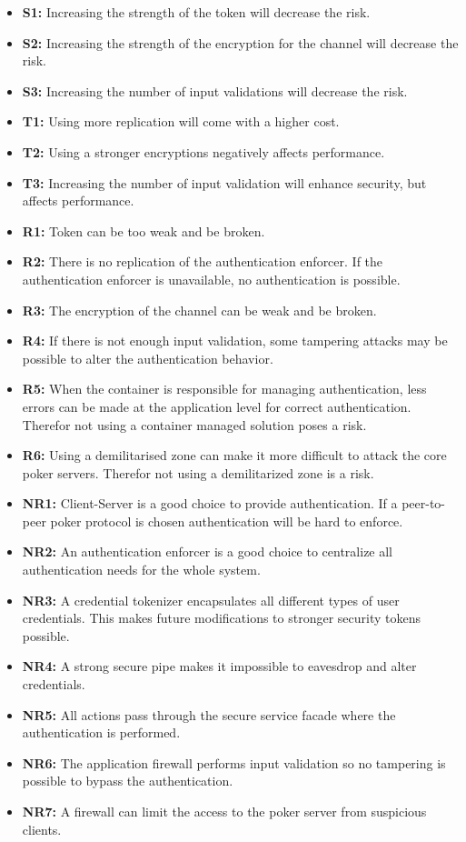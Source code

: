 \documentclass[a4paper,11pt]{report}
\begin{document}
\begin{itemize}
\item \textbf{S1:} Increasing the strength of the token will decrease the risk.
\item \textbf{S2:} Increasing the strength of the encryption for the channel will decrease the risk.
\item \textbf{S3:} Increasing the number of input validations will decrease the risk.
\item \textbf{T1:} Using more replication will come with a higher cost.
\item \textbf{T2:} Using a stronger encryptions negatively affects performance.
\item \textbf{T3:} Increasing the number of input validation will enhance security, but affects performance.
\item \textbf{R1:} Token can be too weak and be broken.
\item \textbf{R2:} There is no replication of the authentication enforcer. If the authentication enforcer is unavailable, no authentication is possible.
\item \textbf{R3:} The encryption of the channel can be weak and be broken.
\item \textbf{R4:} If there is not enough input validation, some tampering attacks may be possible to alter the authentication behavior.
\item \textbf{R5:} When the container is responsible for managing authentication, less errors can be made at the application level for correct authentication. Therefor not using a container managed solution poses a risk.
\item \textbf{R6:} Using a demilitarised zone can make it more difficult to attack the core poker servers. Therefor not using a demilitarized zone is a risk.
\item \textbf{NR1:} Client-Server is a good choice to provide authentication. If a peer-to-peer poker protocol is chosen authentication will be hard to enforce.
\item \textbf{NR2:} An authentication enforcer is a good choice to centralize all authentication needs for the whole system.
\item \textbf{NR3:} A credential tokenizer encapsulates all different types of user credentials. This makes future modifications to stronger security tokens possible.
\item \textbf{NR4:} A strong secure pipe makes it impossible to eavesdrop and alter credentials. 
\item \textbf{NR5:} All actions pass through the secure service facade where the authentication is performed.
\item \textbf{NR6:} The application firewall performs input validation so no tampering is possible to bypass the authentication.
\item \textbf{NR7:} A firewall can limit the access to the poker server from suspicious clients.
\end{itemize}
\end{document}
